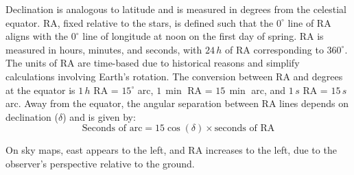 Declination is analogous to latitude and is measured in degrees from the celestial equator. RA, fixed relative to the stars, is defined such that the $0^\circ$ line of RA aligns with the $0^\circ$ line of longitude at noon on the first day of spring. RA is measured in hours, minutes, and seconds, with $24\,h$ of RA corresponding to $360^\circ$. \\

The units of RA are time-based due to historical reasons and simplify calculations involving Earth's rotation. The conversion between RA and degrees at the equator is $1\,h$ RA = $15^\circ$ arc, $1\, \min$ RA = $15\, \min$ arc, and $1\,s$ RA = $15\,s$ arc. Away from the equator, the angular separation between RA lines depends on declination ($\delta$) and is given by:
\[
\text{Seconds of arc} = 15 \cos (\delta) \times \text{seconds of RA}
\]

On sky maps, east appears to the left, and RA increases to the left, due to the observer's perspective relative to the ground.

